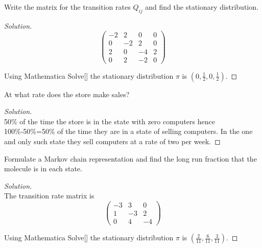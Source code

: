 \documentclass[12pt]{article}
\newenvironment{problem}[2][Problem]{\begin{trivlist}
\item[\hskip \labelsep {\bfseries #1}\hskip \labelsep {\bfseries #2.}]}{\end{trivlist}}
\newenvironment{solution}
  {\begin{proof}[Solution]\renewcommand{\qedsymbol}{}}
  {\end{proof}}
\begin{document}
\begin{problem}{4.2(a)}
Write the matrix for the transition rates $Q_{ij}$ and find the stationary distribution.
\end{problem}
 
\begin{solution}\ \\ 
$$
\begin{pmatrix}
-2 & 2 & 0 & 0\\ 
0 & -2 & 2 & 0\\ 
2 & 0 & -4 & 2\\ 
0 & 2 & -2 & 0
\end{pmatrix}
$$

\noindent Using Mathematica Solve[] the stationary distribution $\pi$ is $(0,\frac{1}{2},0,\frac{1}{2})$.
\end{solution} 
\begin{problem}{4.2(b)} 
At what rate does the store make sales?
\end{problem}

\begin{solution}\ \\
50\% of the time the store is in the state with zero computers hence 100\%-50\%=50\% of the time they are in a state of selling computers. In the one and only such state they sell computers at a rate of two per week.
\end{solution}

\begin{problem}{4.9}
Formulate a Markov chain representation and find the long run fraction that the molecule is in each state.
\end{problem}

\begin{solution}\ \\
The transition rate matrix is 
$$
\begin{pmatrix}
-3 & 3 & 0\\ 
 1& -3 & 2\\ 
 0& 4 & -4
\end{pmatrix}
$$

\noindent Using Mathematica Solve[] the stationary distribution $\pi$ is $(\frac{2}{11},\frac{6}{11},\frac{3}{11})$.
\end{solution}
 
\end{document}
